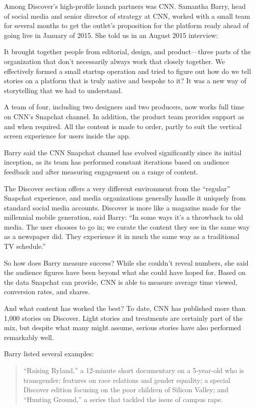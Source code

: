 \documentclass[notoc, symmetric, nobib, nols]{towcenter-guideto-book}
\begin{document}
Among Discover's high-profile launch partners was CNN. Samantha Barry, head of social media and senior director of strategy at CNN, worked with a small team for several months to get the outlet's proposition for the platform ready ahead of going live in January of 2015. She told us in an August 2015 interview: 

It brought together people from editorial, design, and product---three parts of the organization that don't necessarily always work that closely together. We effectively formed a small startup operation and tried to figure out how do we tell stories on a platform that is truly native and bespoke to it? It was a new way of storytelling that we had to understand. 

A team of four, including two designers and two producers, now works full time on CNN's Snapchat channel. In addition, the product team provides support as and when required. All the content is made to order, partly to suit the vertical screen experience for users inside the app. 

Barry said the CNN Snapchat channel has evolved significantly since its initial inception, as its team has performed constant iterations based on audience feedback and after measuring engagement on a range of content. 

The Discover section offers a very different environment from the ``regular'' Snapchat experience, and media organizations generally handle it uniquely from standard social media accounts. Discover is more like a magazine made for the millennial mobile generation, said Barry: ``In some ways it's a throwback to old media. The user chooses to go in; we curate the content they see in the same way as a newspaper did. They experience it in much the same way as a traditional TV schedule.''

So how does Barry measure success? While she couldn't reveal numbers, she said the audience figures have been beyond what she could have hoped for. Based on the data Snapchat can provide, CNN is able to measure average time viewed, conversion rates, and shares. 

And what content has worked the best? To date, CNN has published more than 1,000 stories on Discover. Light stories and treatments are certainly part of the mix, but despite what many might assume, serious stories have also performed remarkably well.

Barry listed several examples: 

\begin{quote}
``Raising Ryland,'' a 12-minute short documentary on a 5-year-old who is transgender; features on race relations and gender equality; a special Discover edition focusing on the poor children of Silicon Valley; and ``Hunting Ground,'' a series that tackled the issue of campus rape. 
\end{quote}
\end{document}
